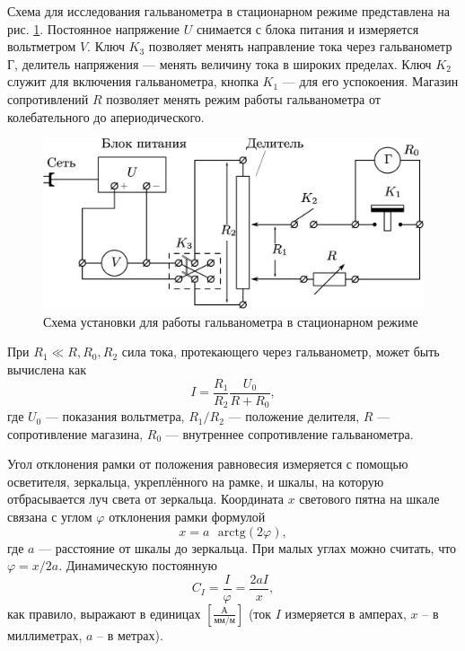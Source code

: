 \documentclass[a4paper, 12pt]{article}
\begin{document}
     \vspace{0.1cm}
    
    Схема для исследования гальванометра в стационарном режиме представлена на рис. \ref{pic1}. Постоянное напряжение $U$ снимается с блока питания и измеряется вольтметром $V$. Ключ $K_3$ позволяет менять направление тока через гальванометр Г, делитель напряжения — менять величину тока в широких пределах. Ключ $K_2$ служит для включения гальванометра, кнопка $K_1$ — для его успокоения. Магазин сопротивлений $R$ позволяет менять режим работы гальванометра от колебательного до апериодического.
    
    \begin{figure}[ht]
        \centering
        \includegraphics[width=0.8\linewidth]{images/scheme1.png}
        \caption{Схема установки для работы гальванометра в стационарном режиме}
        \label{pic1}
    \end{figure}
    
    При $R_1 \ll R, R_0, R_2$ сила тока, протекающего через гальванометр, может быть вычислена как
    \begin{equation}
        I = \frac{R_1}{R_2} \frac{U_0}{R + R_0},
        \label{eq1}
    \end{equation}
    где $U_0$ — показания вольтметра, $R_1/R_2$ — положение делителя, $R$ — сопротивление магазина, $R_0$ — внутреннее сопротивление гальванометра.
    
    Угол отклонения рамки от положения равновесия измеряется с помощью осветителя, зеркальца, укреплённого на рамке, и шкалы, на которую отбрасывается луч света от зеркальца. Координата $x$ светового пятна на шкале связана с углом $\varphi$ отклонения рамки формулой
    \begin{equation}
        x = a \text{ } \mathrm{arctg}(2 \varphi),
    \end{equation}
    где $a$ — расстояние от шкалы до зеркальца. При малых углах можно считать, что $\varphi = x/2a$. Динамическую постоянную
    \begin{equation}
        C_I = \frac{I}{\varphi} = \frac{2aI}{x},
        \label{eq2}
    \end{equation}
    как правило, выражают в единицах $\left[\frac{\text{А}}{\text{мм}/\text{м}}\right]$ (ток $I$ измеряется в амперах, $x$ – в миллиметрах, $a$ – в метрах). \\
    
\end{document}
